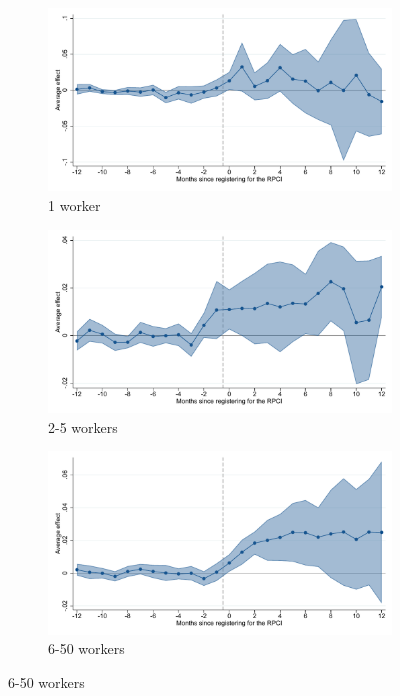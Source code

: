 \begin{figure}[H]
    \begin{subfigure}{0.32\textwidth}
    \caption{1 worker}
    \includegraphics[width=\textwidth]{04_Figures/muestra_10porciento/event_study_log_sal_cierre_size_1_dcdh_connected.pdf}
    \end{subfigure}
    \begin{subfigure}{0.32\textwidth}
    \caption{2-5 workers}
    \includegraphics[width=\textwidth]{04_Figures/muestra_10porciento/event_study_log_sal_cierre_size_2_dcdh_connected.pdf}
    \end{subfigure}
    \begin{subfigure}{0.32\textwidth}
    \caption{6-50 workers}
    \includegraphics[width=\textwidth]{04_Figures/muestra_10porciento/event_study_log_sal_cierre_size_6_dcdh_connected.pdf}
    \end{subfigure}
    
\end{figure}

